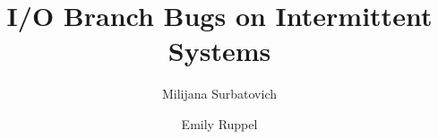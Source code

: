 \documentclass[10pt,twocolumn]{article}
\begin{document}
\title{\bf I/O Branch Bugs on Intermittent Systems}
\author{
Milijana Surbatovich
\and
Emily Ruppel
}
\date{}
\maketitle
\thispagestyle{empty}











 

\end{document}
